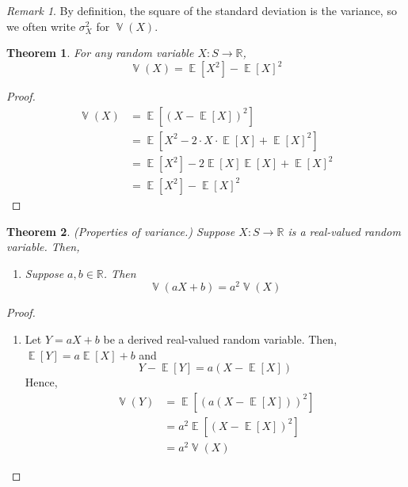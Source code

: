 \documentclass[11pt,letterpaper]{article}
\newtheorem{thm}{Theorem}
\theoremstyle{definition}
\theoremstyle{remark}
\newtheorem{rem}{Remark}[section]
\newcommand{\parens}[1]{\left(#1\right)}
\newcommand{\R}{\mathbb{R}}
\DeclareMathOperator{\Expect}{\mathbb{E}}
\newcommand{\E}[1]{\Expect{\left[#1\right]}}
\DeclareMathOperator{\Var}{\mathbb{V}}
\newcommand{\V}[1]{\Var{\parens{#1}}}
\begin{document}
\begin{rem}
    By definition, the square of the standard deviation is the variance, so we
    often write $\sigma_X^2$ for $\V{X}$.
\end{rem}

\begin{thm}
    \label{thm:alternative-variance}
    For any random variable $X : S \to \R$,
    \begin{equation*}
        \V{X} = \E{X^2} - \E{X}^2
    \end{equation*}
\end{thm}

\begin{proof}
    \begin{align*}
        \V{X}
        &= \E{\parens{X - \E{X}}^2} \\
        &= \E{X^2 - 2 \cdot X \cdot \E{X} + \E{X}^2} \\
        &= \E{X^2} - 2 \E{X} \E{X} + \E{X}^2 \\
        &= \E{X^2} - \E{X}^2
    \end{align*}
\end{proof}

\begin{thm}{(Properties of variance.)}
    \label{thm:variance-properties}
    Suppose $X : S \to \R$ is a real-valued random variable. Then,
    \begin{enumerate}
        \item
            Suppose $a, b \in \R$. Then
            \begin{equation}
                \label{eq:variance-linearity}
                \V{a X + b} = a^2 \V{X}
            \end{equation}
    \end{enumerate}
\end{thm}

\begin{proof}
    \begin{enumerate}
        \item
            Let $Y = a X + b$ be a derived real-valued random variable.
            Then, $\E{Y} = a \E{X} + b$ and
            \begin{equation*}
                Y - \E{Y} = a(X - \E{X})
            \end{equation*}
            Hence,
            \begin{align*}
                \V{Y}
                &= \E{\parens{a\parens{X - \E{X}}}^2} \\
                &= a^2 \E{\parens{X - \E{X}}^2} \\
                &= a^2 \V{X}
            \end{align*}
    \end{enumerate}
\end{proof}
\end{document}
